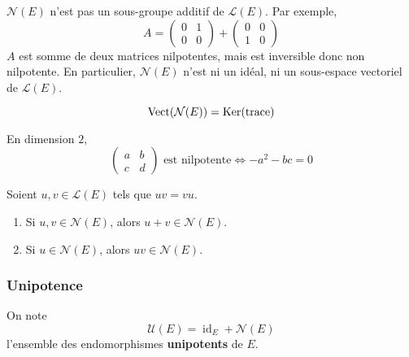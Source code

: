   \begin{remark}
    $\mathcal{N}(E)$ n'est pas un sous-groupe additif de $\mathcal{L}(E)$. Par exemple,
    \[
      A =
      \begin{pmatrix}
        0 & 1 \\
        0 & 0
      \end{pmatrix}
      +
      \begin{pmatrix}
        0 & 0 \\
        1 & 0
      \end{pmatrix}
    \]
    $A$ est somme de deux matrices nilpotentes, mais est inversible donc non nilpotente. En particulier, $\mathcal{N}(E)$ n'est ni un idéal, ni un sous-espace vectoriel de $\mathcal{L}(E)$.
  \end{remark}

  \begin{proposition}
    \[ \operatorname{Vect}(\mathcal{N}(E)) = \mathrm{Ker}(\operatorname{trace}) \]
  \end{proposition}

  \begin{example}
    En dimension $2$,
    \[
      \begin{pmatrix}
        a & b \\
        c & d
      \end{pmatrix}
      \text{ est nilpotente}
      \iff
      -a^2 -bc = 0
    \]
  \end{example}

  \begin{proposition}
    Soient $u, v \in \mathcal{L}(E)$ tels que $uv = vu$.
    \begin{enumerate}[label=(\roman*)]
      \item Si $u, v \in \mathcal{N}(E)$, alors $u + v \in \mathcal{N}(E)$.
      \item Si $u \in \mathcal{N}(E)$, alors $uv \in \mathcal{N}(E)$.
    \end{enumerate}
  \end{proposition}

  \subsubsection{Unipotence}


  \begin{definition}
    On note
    \[ \mathcal{U}(E) = \operatorname{id}_E + \mathcal{N}(E) \]
    l'ensemble des endomorphismes \textbf{unipotents} de $E$.
  \end{definition}


